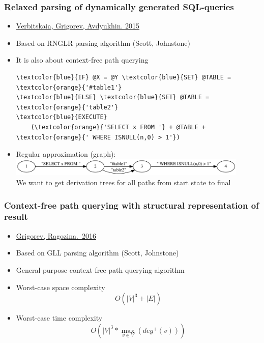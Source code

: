 \documentclass[xcolor=table]{beamer}
\begin{document}
\begin{frame}[fragile]
  \transwipe[direction=90]
  \frametitle{Relaxed parsing of dynamically generated SQL-queries}
  \begin{itemize}
    \item \href{https://link.springer.com/chapter/10.1007/978-3-319-41579-6\_22}{Verbitskaia, Grigorev, Avdyukhin. 2015}
    \item Based on RNGLR parsing algorithm (Scott, Johnstone)
    \item It is also about context-free path querying

        \begin{Verbatim}[commandchars=\\\{\}]
\textcolor{blue}{IF} @X = @Y \textcolor{blue}{SET} @TABLE = \textcolor{orange}{'#table1'}
\textcolor{blue}{ELSE} \textcolor{blue}{SET} @TABLE = \textcolor{orange}{'table2'}
\textcolor{blue}{EXECUTE} 
    (\textcolor{orange}{'SELECT x FROM '} + @TABLE + \textcolor{orange}{' WHERE ISNULL(n,0) > 1'})
        \end{Verbatim}
     \item Regular approximation (graph): 
                \includegraphics[width = 0.9\textwidth]{pictures/approximation1.pdf} \\
      We want to get derivation trees for all paths from start state to final
  \end{itemize}
\end{frame}

\begin{frame}
  \transwipe[direction=90]
  \frametitle{Context-free path querying with structural representation of result}
  \begin{itemize}
    \item \href{https://arxiv.org/abs/1612.08872}{Grigorev, Ragozina.~2016}
    \item Based on GLL parsing algorithm (Scott, Johnstone)
    \item General-purpose context-free path querying algorithm
    \item Worst-case space complexity $$O(|V|^3 + |E|)$$
    \item Worst-case time complexity $$O\left(|V|^3*\max\limits_{v \in V}\left(deg^+\left(v\right)\right)\right)$$
  \end{itemize}
\end{frame}
\end{document}
